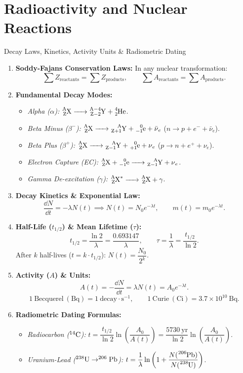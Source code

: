 \chapter{Radioactivity and Nuclear Reactions}
\label{chap:exo_ch03}

\begin{quicksummary}{Decay Laws, Kinetics, Activity Units \& Radiometric Dating}
\begin{enumerate}[leftmargin=1.4em,itemsep=3pt]
  \item \textbf{Soddy-Fajans Conservation Laws:}
  In any nuclear transformation:
  \[
  \sum Z_{\text{reactants}} = \sum Z_{\text{products}}, \qquad 
  \sum A_{\text{reactants}} = \sum A_{\text{products}}.
  \]
  \item \textbf{Fundamental Decay Modes:}
  \begin{itemize}[leftmargin=1.2em,itemsep=1pt]
    \item \textit{Alpha ($\alpha$):} $\ce{^{A}_{Z}X -> ^{A-4}_{Z-2}Y + ^{4}_{2}He}$.
    \item \textit{Beta Minus ($\beta^-$):} $\ce{^{A}_{Z}X -> ^{A}_{Z+1}Y + ^{0}_{-1}e + \bar{\nu}_e}$ \quad ($n \to p + e^- + \bar{\nu}_e$).
    \item \textit{Beta Plus ($\beta^+$):} $\ce{^{A}_{Z}X -> ^{A}_{Z-1}Y + ^{0}_{+1}e + \nu_e}$ \quad ($p \to n + e^+ + \nu_e$).
    \item \textit{Electron Capture (EC):} $\ce{^{A}_{Z}X + ^{0}_{-1}e -> ^{A}_{Z-1}Y + \nu_e}$.
    \item \textit{Gamma De-excitation ($\gamma$):} $\ce{^{A}_{Z}X^* -> ^{A}_{Z}X + \gamma}$.
  \end{itemize}
  \item \textbf{Decay Kinetics \& Exponential Law:}
  \[
  \frac{\dd N}{\dd t} = -\lambda N(t) \implies N(t) = N_0 e^{-\lambda t}, \qquad m(t) = m_0 e^{-\lambda t}.
  \]
  \item \textbf{Half-Life ($t_{1/2}$) \& Mean Lifetime ($\tau$):}
  \[
  t_{1/2} = \frac{\ln 2}{\lambda} = \frac{0.693147}{\lambda}, \qquad \tau = \frac{1}{\lambda} = \frac{t_{1/2}}{\ln 2}.
  \]
  After $k$ half-lives ($t = k \cdot t_{1/2}$): $N(t) = \dfrac{N_0}{2^k}$.
  \item \textbf{Activity ($A$) \& Units:}
  \[
  A(t) = -\frac{\dd N}{\dd t} = \lambda N(t) = A_0 e^{-\lambda t}.
  \]
  \[
  1\ \mathrm{Becquerel\ (Bq)} = 1\ \mathrm{decay\cdot s^{-1}}, \qquad 1\ \mathrm{Curie\ (Ci)} = 3.7 \times 10^{10}\ \mathrm{Bq}.
  \]
  \item \textbf{Radiometric Dating Formulas:}
  \begin{itemize}[leftmargin=1.2em,itemsep=1pt]
    \item \textit{Radiocarbon ($^{14}\ce{C}$):} $t = \dfrac{t_{1/2}}{\ln 2} \ln \left( \dfrac{A_0}{A(t)} \right) = \dfrac{5730\ \mathrm{yr}}{\ln 2} \ln \left( \dfrac{A_0}{A(t)} \right)$.
    \item \textit{Uranium-Lead ($^{238}\ce{U} \to ^{206}\ce{Pb}$):} $t = \dfrac{1}{\lambda} \ln \left( 1 + \dfrac{N(\ce{^{206}Pb})}{N(\ce{^{238}U})} \right)$.
  \end{itemize}
\end{enumerate}
\end{quicksummary}

